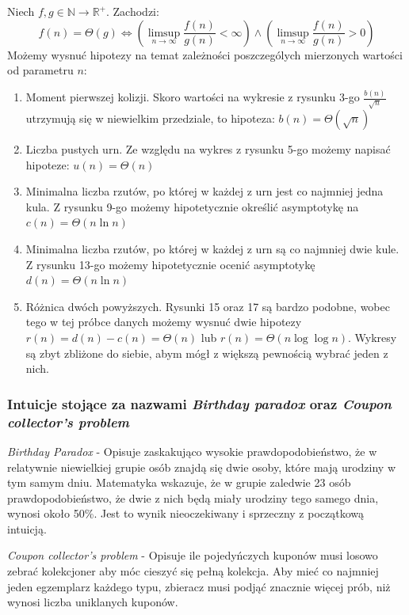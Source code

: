 \documentclass{article}
\newenvironment{fact}[1]{%
    \trivlist
    \item[\hskip\labelsep\textbf{Fakt. #1.}]
    \ignorespaces
}{%
    \endtrivlist
}
\begin{document}
\begin{fact}{Big Theta Limit}
    Niech $f,g \in\mathbb{N}\rightarrow\mathbb{R}^{+}$. Zachodzi:
    \[f(n)=\Theta(g) \iff \left(\limsup_{n\rightarrow\infty} \frac{f(n)}{g(n)} < \infty \right) \land \left(\limsup_{n\rightarrow\infty} \frac{f(n)}{g(n)} > 0 \right)\]
\end{fact}
Możemy wysnuć hipotezy na temat zależności poszczególych mierzonych wartości od parametru $n$:

\begin{enumerate}
    \item Moment pierwszej kolizji. Skoro wartości na wykresie z rysunku 3-go $\frac{b(n)}{\sqrt{n}}$ utrzymują się w niewielkim przedziale, to hipoteza: $b(n) = \Theta(\sqrt{n})$
    \item Liczba pustych urn. Ze względu na wykres z rysunku 5-go możemy napisać hipoteze: $u(n) = \Theta(n)$
    \item Minimalna liczba rzutów, po której w każdej z urn jest co najmniej jedna kula. Z rysunku 9-go możemy hipotetycznie określić asymptotykę na $c(n) = \Theta(n\ln n)$
    \item Minimalna liczba rzutów, po której w każdej z urn są co najmniej dwie kule. Z rysunku 13-go możemy hipotetycznie ocenić asymptotykę $d(n)=\Theta(n\ln n)$
    \item Różnica dwóch powyższych. Rysunki 15 oraz 17 są bardzo podobne, wobec tego w tej próbce danych możemy wysnuć dwie hipotezy $r(n)=d(n)-c(n)=\Theta(n)$ lub $r(n)=\Theta(n\log\log n)$. Wykresy są zbyt zbliżone do siebie, abym mógł z większą pewnością wybrać jeden z nich.
\end{enumerate}

\subsubsection{Intuicje stojące za nazwami \textit{Birthday paradox} oraz \textit{Coupon collector's problem}}

\textit{Birthday Paradox} - Opisuje zaskakująco wysokie prawdopodobieństwo, że w relatywnie niewielkiej grupie osób znajdą się dwie osoby, które mają urodziny w tym samym dniu. Matematyka wskazuje, że w grupie zaledwie 23 osób prawdopodobieństwo, że dwie z nich będą miały urodziny tego samego dnia, wynosi około 50\%. Jest to wynik nieoczekiwany i sprzeczny z początkową intuicją.

\textit{Coupon collector's problem} - Opisuje ile pojedyńczych kuponów musi losowo zebrać kolekcjoner aby móc cieszyć się pełną kolekcja. Aby mieć co najmniej jeden egzemplarz każdego typu, zbieracz musi podjąć znacznie więcej prób, niż wynosi liczba uniklanych kuponów.
\end{document}
